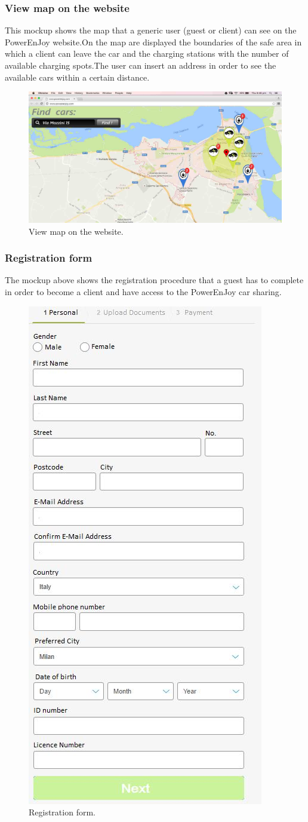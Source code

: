\subsubsection{View map on the website} This mockup shows the map that a generic user (guest or client) can see on the PowerEnJoy website.On the map are displayed the boundaries of the safe area in which a client can leave the car and the charging stations with the number of available charging spots.The user can insert an address in order to see the available cars within a certain distance.
\begin{figure}[h]
\centering
\includegraphics[width=450 pt]{resources/mappa.jpg}
\caption{\label{fig:mappa}View map on the website.}
\end{figure}

\subsubsection{Registration form} The mockup above shows the registration procedure that a guest has to complete in order to become a client and have access to the PowerEnJoy car sharing.

\begin{figure}[h]
\centering
\includegraphics[height=200 pt]{resources/registrazione.jpg}
\caption{\label{fig:reg}Registration form.}
\end{figure}

